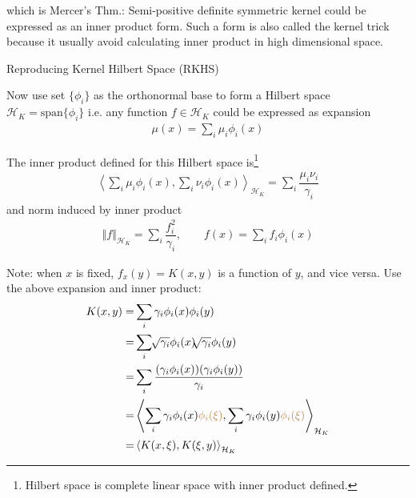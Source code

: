     which is Mercer's Thm.: Semi-positive definite symmetric kernel could be expressed as an inner product form. Such a form is also called the kernel trick because it usually avoid calculating inner product in high dimensional space.
    
\begin{point}
    Reproducing Kernel Hilbert Space (RKHS)
\end{point}

    Now use set $ \{\phi _i\} $ as the orthonormal base to form a Hilbert space $ \mathcal{H}_K=\mathrm{span}\{\phi _i\}  $ i.e. any function $ f\in\mathcal{H}_K $ could be expressed as expansion
    \begin{align}
        \mu (x)=\sum_{i} \mu _i\phi _i(x)
    \end{align}

    The inner product defined for this Hilbert space is\footnote{Hilbert space is complete linear space with inner product defined.}
    \begin{align}
        \left\langle \sum_{i}\mu _i\phi _i(x), \sum_{i}\nu _i\phi _i(x)\right\rangle _{\mathcal{H}_K} = \sum_{i}\dfrac{\mu _i\nu _i}{\gamma _i}
    \end{align}
    and norm induced by inner product
    \begin{align}
        \left\Vert f \right\Vert _{\mathcal{H}_K}=\sum_{i}\dfrac{f_i^2}{\gamma _i},\qquad f(x)=\sum_{i}f_i\phi _i(x)
    \end{align}
    
    
    
    Note: when $ x $ is fixed, $ f_x(y)= K(x,y) $ is a function of $ y $, and vice versa. Use the above expansion and inner product:
    \begin{align}
        K(x,y)=& \sum_{i}\gamma _i\phi _i(x)\phi _i(y)\\
        =&\sum_{i}\sqrt[]{\gamma _i}\phi _i(x)\sqrt[]{\gamma _i}\phi _i(y)\\
        =&\sum_{i}\dfrac{(\gamma _i\phi _i(x))(\gamma _i\phi _i(y))}{\gamma _i}\\
        =&\left\langle \sum_{i}\gamma _i\phi _i(x){\color{brown} \phi _i(\xi )},\sum_{i}\gamma _i\phi _i(y){\color{brown} \phi _i(\xi )} \right\rangle _{\mathcal{H}_K}\\
        =&\left\langle K(x,\xi ),K(\xi ,y) \right\rangle _{\mathcal{H}_K}
    \end{align}

